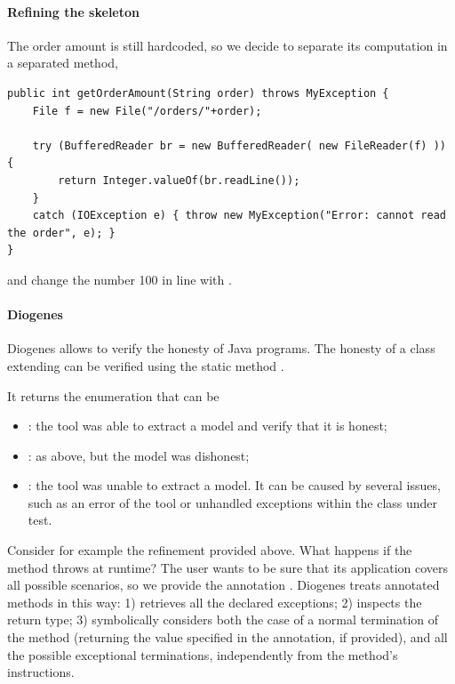 \paragraph{Refining the skeleton}
The order amount is still hardcoded, so we decide to separate its computation
in a separated method, \eg
\begin{mdframed}
\begin{verbatim}
public int getOrderAmount(String order) throws MyException {
    File f = new File("/orders/"+order);
    
    try (BufferedReader br = new BufferedReader( new FileReader(f) )) {
        return Integer.valueOf(br.readLine());        
    }
    catch (IOException e) { throw new MyException("Error: cannot read the order", e); }    
}
\end{verbatim}
\end{mdframed}
and change the number 100 in line  with .

\paragraph{Diogenes}
Diogenes allows to verify the honesty of Java programs.
The honesty of a class extending  
can be verified using the static method 
.

It returns the enumeration  that can be
\begin{itemize}
\item {}: the tool was able to extract a \coco model and verify that it is honest;
\item {}: as above, but the model was dishonest;
\item {}: the tool was unable to extract a model. 
It can be caused by several issues, such as an error of the 
tool or unhandled exceptions within the class under test.
\end{itemize}

Consider for example the refinement provided above.
What happens if the method throws  at runtime?
The user wants to be sure that its application covers all possible scenarios,
so we provide the annotation .
Diogenes treats annotated methods in this way:
1) retrieves all the declared exceptions;
2) inspects the return type;
3) symbolically considers both the case of a normal termination of the method
(returning the value specified in the annotation, if provided),
and all the possible exceptional terminations, 
independently from the method's instructions.

